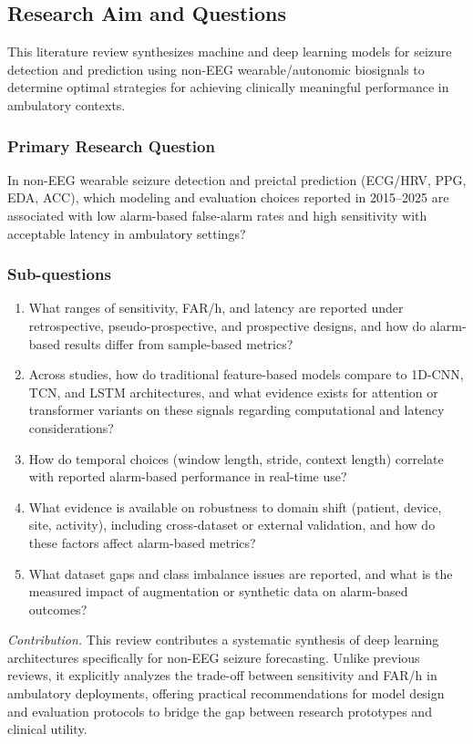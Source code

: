 \subsection{Research Aim and Questions}
This literature review synthesizes machine and deep learning models for
seizure detection and prediction using non-EEG wearable/autonomic
biosignals to determine optimal strategies for achieving clinically
meaningful performance in ambulatory contexts.

\subsubsection{Primary Research Question}
In non-EEG wearable seizure detection and preictal prediction
(ECG/HRV, PPG, EDA, ACC), which modeling and evaluation choices
reported in 2015--2025 are associated with low alarm-based
false-alarm rates and high sensitivity with acceptable latency in
ambulatory settings?

\subsubsection{Sub-questions}
\begin{enumerate}
  \item What ranges of sensitivity, FAR/h, and latency are reported under
    retrospective, pseudo-prospective, and prospective designs, and how
    do alarm-based results differ from sample-based metrics?
  \item Across studies, how do traditional feature-based models compare
    to 1D-CNN, TCN, and LSTM architectures, and what evidence exists for
    attention or transformer variants on these signals regarding
    computational and latency considerations?
  \item How do temporal choices (window length, stride, context length)
    correlate with reported alarm-based performance in real-time use?
  \item What evidence is available on robustness to domain shift
    (patient, device, site, activity), including cross-dataset or
    external validation, and how do these factors affect alarm-based
    metrics?
  \item What dataset gaps and class imbalance issues are reported, and
    what is the measured impact of augmentation or synthetic data on
    alarm-based outcomes?
\end{enumerate}

\medskip
\noindent\textit{Contribution.}
This review contributes a systematic synthesis of deep learning
architectures specifically for non-EEG seizure forecasting. Unlike
previous reviews, it explicitly analyzes the trade-off between
sensitivity and FAR/h in ambulatory deployments, offering practical
recommendations for model design and evaluation protocols to bridge
the gap between research prototypes and clinical utility.

